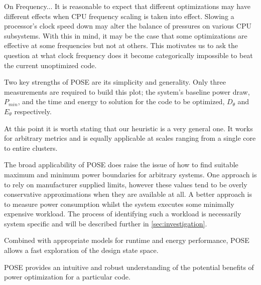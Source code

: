 \clearpage
{}



On Frequency...
It is reasonable to expect that different optimizations may have different effects when CPU frequency scaling is taken into effect. Slowing a processor's clock speed down may alter the balance of pressures on various CPU subsystems. With this in mind, it may be the case that some optimizations are effective at some frequencies but not at others. This motivates us to ask the question at what clock frequency does it become categorically impossible to beat the current unoptimized code.

\todo{} Two key strengths of POSE are its simplicity and generality.
Only three measurements are required to build this plot; the system's baseline power draw, $P_{min}$, and the time and energy to solution for the code to be optimized, $D_\theta$ and $E_\theta$ respectively.



\todo{} At this point it is worth stating that our heuristic is a very general one.
It works for arbitrary metrics and is equally applicable at scales ranging from a single core to entire clusters.


The broad applicability of POSE does raise the issue of how to find suitable maximum and minimum power boundaries for arbitrary systems. 
One approach is to rely on manufacturer supplied limits, however these values tend to be overly conservative approximations when they are available at all.
A better approach is to measure power consumption whilst the system executes some minimally expensive workload. 
The process of identifying such a workload is necessarily system specific and will be described further in \autoref{sec:investigation}.

Combined with appropriate models for runtime and energy performance, POSE allows a fast exploration of the design state space.


POSE provides an intuitive and robust understanding of the potential benefits of power optimization for a particular code. 
